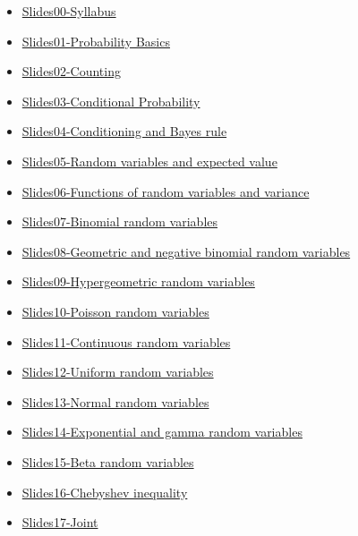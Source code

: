 \documentclass[
  letterpaper,
  DIV=11,
  numbers=noendperiod]{scrartcl}
\begin{document}
\begin{itemize}
\item
  \href{https://luc-umass.github.io/pdf/NSlides25-00.pdf}{Slides00-Syllabus}
\item
  \href{https://luc-umass.github.io/pdf/NSlides25-01.pdf}{Slides01-Probability
  Basics}
\item
  \href{https://luc-umass.github.io/pdf/NSlides25-02.pdf}{Slides02-Counting}
\item
  \href{https://luc-umass.github.io/pdf/NSlides25-03.pdf}{Slides03-Conditional
  Probability}
\item
  \href{https://luc-umass.github.io/pdf/NSlides25-04.pdf}{Slides04-Conditioning
  and Bayes rule}
\item
  \href{https://luc-umass.github.io/pdf/NSlides25-05.pdf}{Slides05-Random
  variables and expected value}
\item
  \href{https://luc-umass.github.io/pdf/NSlides25-06.pdf}{Slides06-Functions
  of random variables and variance}
\item
  \href{https://luc-umass.github.io/pdf/NSlides25-07.pdf}{Slides07-Binomial
  random variables}
\item
  \href{https://luc-umass.github.io/pdf/NSlides25-08.pdf}{Slides08-Geometric
  and negative binomial random variables}
\item
  \href{https://luc-umass.github.io/pdf/NSlides25-09.pdf}{Slides09-Hypergeometric
  random variables}
\item
  \href{https://luc-umass.github.io/pdf/NSlides25-10.pdf}{Slides10-Poisson
  random variables}
\item
  \href{https://luc-umass.github.io/pdf/NSlides25-11.pdf}{Slides11-Continuous
  random variables}
\item
  \href{https://luc-umass.github.io/pdf/NSlides25-12.pdf}{Slides12-Uniform
  random variables}
\item
  \href{https://luc-umass.github.io/pdf/NSlides25-13.pdf}{Slides13-Normal
  random variables}
\item
  \href{https://luc-umass.github.io/pdf/NSlides25-14.pdf}{Slides14-Exponential
  and gamma random variables}
\item
  \href{https://luc-umass.github.io/pdf/NSlides25-15.pdf}{Slides15-Beta
  random variables}
\item
  \href{https://luc-umass.github.io/pdf/NSlides25-16.pdf}{Slides16-Chebyshev
  inequality}
\item
  \href{https://luc-umass.github.io/pdf/NSlides25-17.pdf}{Slides17-Joint
}
\end{itemize}
\end{document}
